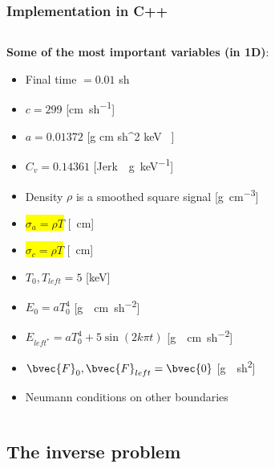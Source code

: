   \begin{frame}
    \frametitle{Implementation in C++}
    \begin{columns}
      \begin{column}{0.5\textwidth}
        \textbf{Some of the most important variables (in 1D)}:
        \scriptsize
        \begin{itemize}
          \item Final time $=0.01$ \si{sh} %
          \item $c = 299$ [\si{\cm \per sh}]
          \item $a = 0.01372$ [\si{g \per cm \per sh^2  \per keV }]
          \item $C_v = 0.14361$ [\si{Jerk \per\g \per keV}] %
          \item Density $\rho$ is a smoothed square signal [\si{\g\per\cm\cubed}]
          \item \colorbox{yellow}{$\sigma_a = \rho T$} [\si{\per\cm}]
          \item \colorbox{yellow}{$\sigma_c = \rho T$} [\si{\per\cm}]
          \item $T_0, T_{left} = 5$ [\si{keV}] %
          \item $E_0 = aT_0^4$ [\si{g \per \cm \per sh^2}]
          \item $E_{left^*} = aT_{0}^4 + 5 \sin (2 k \pi t)$ [\si{g \per \cm \per sh^2}]
          \item $\bvec{F}_0, \bvec{F}_{left} = \bvec{0}$ [\si{g \per sh^2}]
          \item Neumann conditions on other boundaries
        \end{itemize}
      \end{column}
  
  
      \begin{column}{0.5\textwidth}
         \begin{figure}
        \end{figure}
      \end{column}
     \end{columns}
  
  \end{frame}
  

  

\subsection{The inverse problem}



